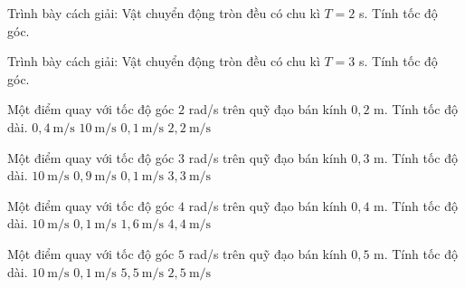 \begin{ex}
Trình bày cách giải: Vật chuyển động tròn đều có chu kì $T=2$ s. Tính tốc độ góc.
\choiceTF

\end{ex}

\begin{ex}
Trình bày cách giải: Vật chuyển động tròn đều có chu kì $T=3$ s. Tính tốc độ góc.
\choiceTF

\end{ex}

\begin{ex}
Một điểm quay với tốc độ góc $2$ rad/s trên quỹ đạo bán kính $0,2$ m. Tính tốc độ dài.
\choice
{\True $0,4\ \mathrm{m/s}$}
{$10\ \mathrm{m/s}$}
{$0,1\ \mathrm{m/s}$}
{$2,2\ \mathrm{m/s}$}
\end{ex}

\begin{ex}
Một điểm quay với tốc độ góc $3$ rad/s trên quỹ đạo bán kính $0,3$ m. Tính tốc độ dài.
\choice
{$10\ \mathrm{m/s}$}
{\True $0,9\ \mathrm{m/s}$}
{$0,1\ \mathrm{m/s}$}
{$3,3\ \mathrm{m/s}$}
\end{ex}

\begin{ex}
Một điểm quay với tốc độ góc $4$ rad/s trên quỹ đạo bán kính $0,4$ m. Tính tốc độ dài.
\choice
{$10\ \mathrm{m/s}$}
{$0,1\ \mathrm{m/s}$}
{\True $1,6\ \mathrm{m/s}$}
{$4,4\ \mathrm{m/s}$}
\end{ex}

\begin{ex}
Một điểm quay với tốc độ góc $5$ rad/s trên quỹ đạo bán kính $0,5$ m. Tính tốc độ dài.
\choice
{$10\ \mathrm{m/s}$}
{$0,1\ \mathrm{m/s}$}
{$5,5\ \mathrm{m/s}$}
{\True $2,5\ \mathrm{m/s}$}
\end{ex}

